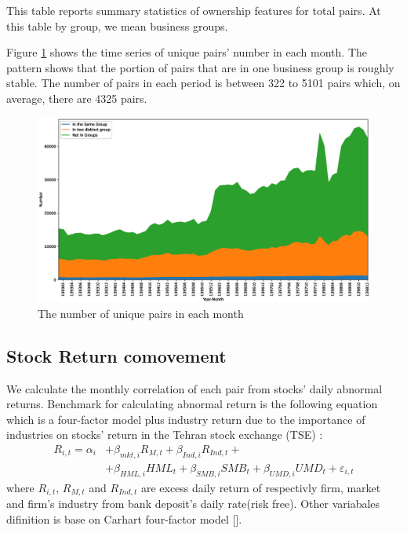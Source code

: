 \documentclass[12pt, a4paper]{article}
\begin{document}
  \begin{table}
  \centering
  \caption{ This table reports summary statistics of ownership features for total pairs. At this table by group, we mean business groups.}
  \label{t2-2}
    \resizebox{1\textwidth}{!}
          {
 
   }
    \end{table}%


 Figure \ref{g2-2} shows the time series of unique pairs' number in each month. The pattern shows that the portion of pairs that are in one business group is roughly stable. The number of pairs in each period is between 322 to 5101 pairs which, on average, there are 4325 pairs.
 
 \normalcolor
 
\begin{figure}[htbp]
\caption{ The number of unique pairs in each month}
\label{g2-2}
\includegraphics[width=\linewidth]{Output/idMonth.eps}
\end{figure}
 
  \FloatBarrier
  
  
  
\subsection{Stock Return comovement}
\label{comovement}

We calculate the monthly correlation of each pair from stocks' daily abnormal returns. Benchmark for calculating abnormal return is the following equation which is a four-factor model plus industry return due to the importance of industries on stocks' return in the Tehran stock exchange (TSE) :
\begin{equation}
 \begin{split}
   R_{i,t} =\alpha _{i}&+\beta _{mkt,i}{\mathit {R}}_{M,t} + \beta_{Ind,i}{\mathit {R}}_{Ind,t} + \\
  &+\beta _{HML,i}{\mathit {HML}}_{t}+\beta _{SMB,i}{\mathit {SMB}}_{t}+\beta _{UMD,i}{\mathit {UMD}}_{t}+ \varepsilon_{i,t}
  \end{split}
     \label{e5Factor}
\end{equation}
where $ R_{i,t} $, $ R_{M,t} $ and $ R_{Ind,t} $ are excess daily return of respectivly  firm, market and firm's industry from bank deposit's daily rate(risk free). Other variabales difinition is base on Carhart four-factor model [\cite{Carhart4Factor}].
\end{document}
